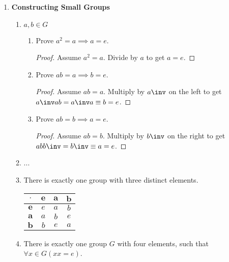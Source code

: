 \begin{enumerate}[label={\Alph*.},font={\bfseries}]
\begin{enumerate}[label={\arabic*},font={\bfseries}]
    \begin{proof}
      $a_1a_2...a_n$ can be rewritten $xa_1a_1^{-1}a_2a_2^{-1}...a_{n/2}a_{n/2}^{-1}$, which is equivalent to $xe$.
    \end{proof}
  \end{enumerate}
\item {\bf Constructing Small Groups}
  \begin{enumerate}[label={\arabic*},font={\bfseries}]
  \item $a,b \in G$
    \begin{enumerate}[label={(\alph*)},font={\bfseries}]
    \item Prove $a^2 = a \implies a = e$.
      \begin{proof}
        Assume $a^2 = a$. Divide by $a$ to get $a = e$.
      \end{proof}
    \item Prove $ab = a \implies b = e$.
      \begin{proof}
        Assume $ab = a$.
        Multiply by $a\inv$ on the left to get ${a\inv}ab = {a\inv}a \equiv b = e$.
      \end{proof}
    \item Prove $ab = b \implies a = e$.
      \begin{proof}
        Assume $ab = b$.
        Multiply by $b\inv$ on the right to get $ab{b\inv} = b\inv \equiv a = e$.
      \end{proof}
    \end{enumerate}
  \item ...
  \item There is exactly one group with three distinct elements.
    \begin{tabular}{ c | c c c }
      $\cdot$ & $\mathbf{e}$ & $\mathbf{a}$ & $\mathbf{b}$ \\
      \hline
      $\mathbf{e}$ & $e$ & $a$ & $b$ \\
      $\mathbf{a}$ & $a$ & $b$ & $e$ \\
      $\mathbf{b}$ & $b$ & $e$ & $a$
    \end{tabular}
  \item There is exactly one group $G$ with four elements, such that $\forall x \in G (xx = e)$.

\end{enumerate}
\end{enumerate}
